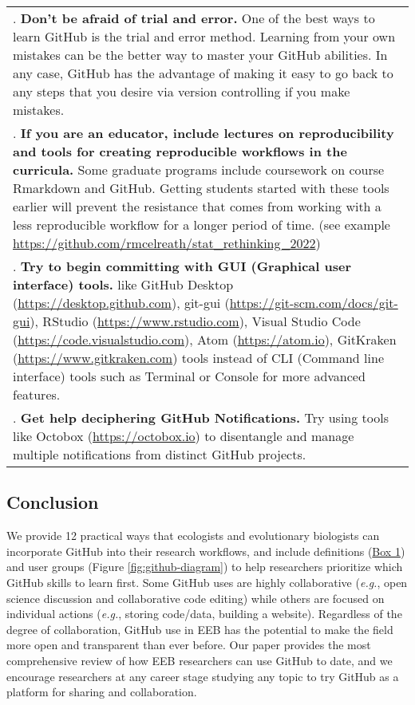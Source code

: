 \begin{tablenos:no-prefix-table-caption}
\begin{longtable}[]{@{}
  >{\raggedright\arraybackslash}p{}@{}}
7. \textbf{Don't be afraid of trial and error.} One of the best ways to learn GitHub is the trial and error method. Learning from your own mistakes can be the better way to master your GitHub abilities. In any case, GitHub has the advantage of making it easy to go back to any steps that you desire via version controlling if you make mistakes. \\
8. \textbf{If you are an educator, include lectures on reproducibility and tools for creating reproducible workflows in the curricula.} Some graduate programs include coursework on course Rmarkdown and GitHub. Getting students started with these tools earlier will prevent the resistance that comes from working with a less reproducible workflow for a longer period of time. (see example \url{https://github.com/rmcelreath/stat_rethinking_2022}) \\
9. \textbf{Try to begin committing with GUI (Graphical user interface) tools.} like GitHub Desktop (\url{https://desktop.github.com}), git-gui (\url{https://git-scm.com/docs/git-gui}), RStudio (\url{https://www.rstudio.com}), Visual Studio Code (\url{https://code.visualstudio.com}), Atom (\url{https://atom.io}), GitKraken (\url{https://www.gitkraken.com}) tools instead of CLI (Command line interface) tools such as Terminal or Console for more advanced features. \\
10. \textbf{Get help deciphering GitHub Notifications.} Try using tools like Octobox (\url{https://octobox.io}) to disentangle and manage multiple notifications from distinct GitHub projects. \\
\bottomrule
\end{longtable}

\end{tablenos:no-prefix-table-caption}

\hypertarget{conclusion}{%
\subsection{Conclusion}\label{conclusion}}

We provide 12 practical ways that ecologists and evolutionary biologists can incorporate GitHub into their research workflows, and include definitions (\protect\hyperlink{definitions}{Box 1}) and user groups (Figure \ref{fig:github-diagram}) to help researchers prioritize which GitHub skills to learn first.
Some GitHub uses are highly collaborative (\emph{e.g.}, open science discussion and collaborative code editing) while others are focused on individual actions (\emph{e.g.}, storing code/data, building a website).
Regardless of the degree of collaboration, GitHub use in EEB has the potential to make the field more open and transparent than ever before.
Our paper provides the most comprehensive review of how EEB researchers can use GitHub to date, and we encourage researchers at any career stage studying any topic to try GitHub as a platform for sharing and collaboration.

